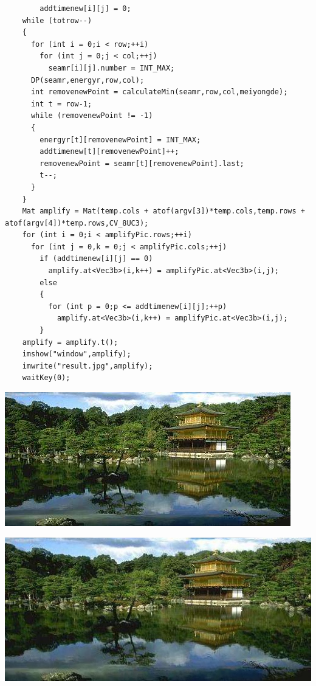 \documentclass[10pt, a4paper]{article}
\begin{document}
\begin{lstlisting}
        addtimenew[i][j] = 0;
    while (totrow--)
    {
      for (int i = 0;i < row;++i)
        for (int j = 0;j < col;++j)
          seamr[i][j].number = INT_MAX;
      DP(seamr,energyr,row,col);
      int removenewPoint = calculateMin(seamr,row,col,meiyongde);
      int t = row-1;
      while (removenewPoint != -1)
      {
        energyr[t][removenewPoint] = INT_MAX;
        addtimenew[t][removenewPoint]++;
        removenewPoint = seamr[t][removenewPoint].last;
        t--;
      }
    }
    Mat amplify = Mat(temp.cols + atof(argv[3])*temp.cols,temp.rows + atof(argv[4])*temp.rows,CV_8UC3);
    for (int i = 0;i < amplifyPic.rows;++i)
      for (int j = 0,k = 0;j < amplifyPic.cols;++j)
        if (addtimenew[i][j] == 0)
          amplify.at<Vec3b>(i,k++) = amplifyPic.at<Vec3b>(i,j);
        else
        {
          for (int p = 0;p <= addtimenew[i][j];++p)
            amplify.at<Vec3b>(i,k++) = amplifyPic.at<Vec3b>(i,j);
        }
    amplify = amplify.t();
    imshow("window",amplify);
    imwrite("result.jpg",amplify);
    waitKey(0);
    \end{lstlisting}

    \includegraphics[scale = .3]{input.jpeg}

    \includegraphics[scale = .3]{inputAmplify.jpg}
\end{document}
